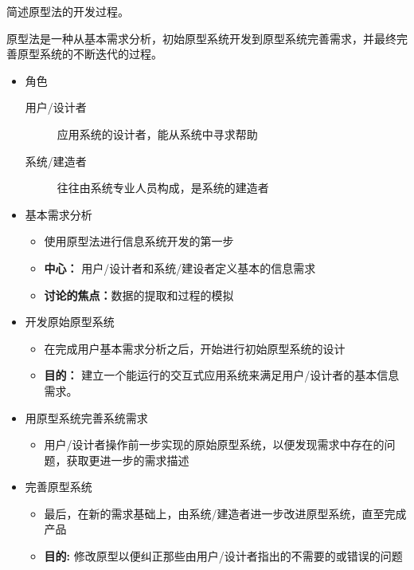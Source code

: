 \documentclass{exam}
\author{\href{https://github.com/Lixinyi-DUT/Project-Wuhu}{芜湖计划}}
\newif\ifprint
\newcommand{\blank}[2][.5cm]{{\makebox[#1][c]{%
			\ifprint
			\phantom{#2}%
			\else
			#2%
			\fi}}}
\begin{document}
\begin{CJK*}{UTF8}{gbsn}

\begin{questions}
	\question 简述原型法的开发过程。\blank[1cm]{P20-21}
	\begin{solution}
		原型法是一种从基本需求分析，初始原型系统开发到原型系统完善需求，并最终完善原型系统的不断迭代的过程。
		\begin{itemize}
			\item 角色
			\begin{description}
				\item[用户/设计者] 应用系统的设计者，能从系统中寻求帮助
				\item[系统/建造者] 往往由系统专业人员构成，是系统的建造者
			\end{description}
			\item 基本需求分析
			\begin{itemize}
				\item 使用原型法进行信息系统开发的第一步
				\item \textbf{中心：} 用户/设计者和系统/建设者定义基本的信息需求
				\item \textbf{讨论的焦点：}数据的提取和过程的模拟
			\end{itemize}
			\item 开发原始原型系统
			\begin{itemize}
				\item 在完成用户基本需求分析之后，开始进行初始原型系统的设计
				\item \textbf{目的：} 建立一个能运行的交互式应用系统来满足用户/设计者的基本信息需求。
			\end{itemize}
			\item 用原型系统完善系统需求
			\begin{itemize}
				\item 用户/设计者操作前一步实现的原始原型系统，以便发现需求中存在的问题，获取更进一步的需求描述
			\end{itemize}
			\item 完善原型系统
			\begin{itemize}
				\item 最后，在新的需求基础上，由系统/建造者进一步改进原型系统，直至完成产品
				\item \textbf{目的:} 修改原型以便纠正那些由用户/设计者指出的不需要的或错误的问题
			\end{itemize}
		\end{itemize}
	\end{solution}
	

\end{questions}
\end{CJK*}
\end{document}
